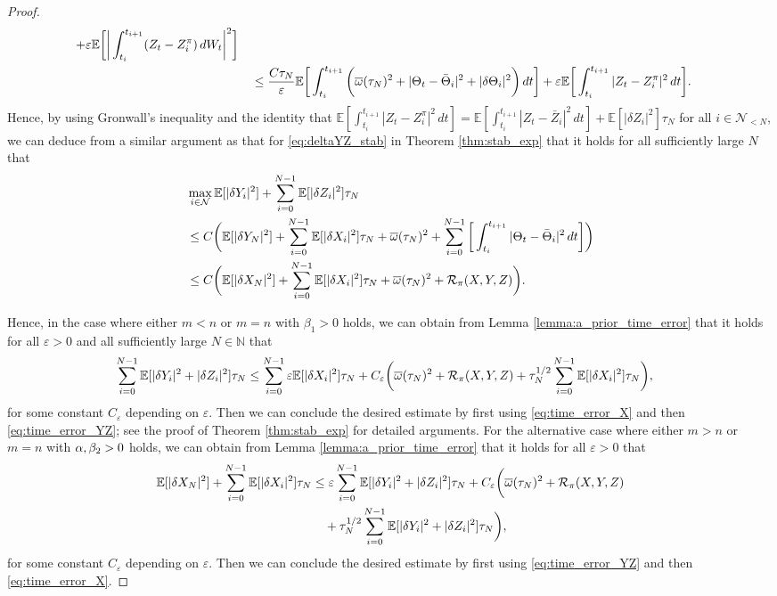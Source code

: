 \documentclass[11pt]{article}
\numberwithin{equation}{section}
\theoremstyle{definition}
\theoremstyle{remark}
\def\ol{\overline} \def\cl{\centerline}   \def\ul{\underline}
\def\l{\label}  \def\f{\frac}  \def\fa{\forall}
\def\eps{\varepsilon}
\def\cN{\mathcal{N}}
\def\cR{\mathcal{R}}
\def\sE{{\mathbb{E}}}
\def\sN{{\mathbb{N}}}
\begin{document}
\begin{proof}
\begin{align*}
\begin{split}
+
\eps\sE\bigg[ \bigg| \int_{t_i}^{t_{i+1}} ({Z}_t-Z^\pi_i)\,d W_t
 \bigg|^2 \bigg]
 \\
 &\quad 
 \le
\frac{C\tau_N}{\eps} \sE\bigg[     \int_{t_i}^{t_{i+1}}
\bigg(\ol{\om}(\tau_N)^2+|\Theta_t-\bar{\Theta}_i|^2+|\delta \Theta_i|^2
\bigg)
\,dt\bigg]
+
\eps\sE\bigg[  \int_{t_i}^{t_{i+1}} |{Z}_t-Z^\pi_i|^2\,dt
 \bigg].
 \end{split}
\end{align*}
Hence, by using Gronwall's inequality 
and 
the identity that
$\sE[\int_{t_i}^{t_{i+1}}| Z_t- {Z}^\pi_i|^2\,dt]
=
\sE[\int_{t_i}^{t_{i+1}}| Z_t- \bar{Z}_i|^2\,dt]
+\sE[|\delta Z_i|^2]\tau_N$ for all $i\in \cN_{<N}$,
we can deduce from  a similar argument as that for \eqref{eq:deltaYZ_stab}
 in Theorem \ref{thm:stab_exp}
 that
it holds for all sufficiently large $N$ that
\begin{align}
&\max_{i\in \cN}\sE[  |\delta Y_{i}|^2]+\sum_{i=0}^{N-1}\sE[|\delta Z_i|^2]\tau_N
\nb
\\
  &\le
 C\bigg(
 \sE[|\delta Y_N|^2]
 +\sum_{i=0}^{N-1}\sE[|\delta X_i|^2]\tau_N
 +
 \ol{\om}(\tau_N)^2
+\sum_{i=0}^{N-1}
\bigg[\int_{t_i}^{t_{i+1}} 
 |\Theta_t-\bar{\Theta}_i|^2
\,dt\bigg]
 \bigg)
 \nb
 \\
  &\le
 C\bigg(
 \sE[|\delta X_N|^2]
 +\sum_{i=0}^{N-1}\sE[|\delta X_i|^2]\tau_N
 +
 \ol{\om}(\tau_N)^2
+\cR_\pi(X,Y,Z)
 \bigg).
\l{eq:time_error_YZ}
  \end{align}

Hence, in the case where 
  either $m< n$ or $m=n$ with $\beta_1>0$ holds,
  we can obtain from Lemma \ref{lemma:a_prior_time_error} that
  it holds for all $\eps>0$
  and all sufficiently large $N\in \sN$ that
\begin{align*}
&
\sum_{i=0}^{N-1}
\sE[
|\delta Y_{i}|^2+|\delta {Z}_i|^2
 ]\tau_N
 \le
\sum_{i=0}^{N-1}
\eps\sE[
|\delta X_{i}|^2]\tau_N
+
C_\eps
\bigg(\ol{\om}(\tau_N)^2
+
\cR_\pi(X,Y,Z)
+\tau_N^{1/2}
\sum_{i=0}^{N-1}
\sE[
|\delta X_{i}|^2
]\tau_N
\bigg),
\end{align*}  
for some constant  $C_\eps$ depending on $\eps$.
Then we can conclude the desired estimate by first using \eqref{eq:time_error_X} and then \eqref{eq:time_error_YZ};
see the proof of   Theorem \ref{thm:stab_exp} for detailed arguments.
For the alternative case  where 
  either  $m>n$ or $m=n$ with $\alpha, \beta_2>0$ holds,
we can obtain from Lemma \ref{lemma:a_prior_time_error} that
  it holds for all $\eps>0$ that
\begin{align*}
 \sE[|\delta X_N|^2]+
\sum_{i=0}^{N-1}
\sE[
|\delta X_{i}|^2
 ]\tau_N
 &
 \le
\eps
\sum_{i=0}^{N-1}
\sE[
|\delta Y_{i}|^2+|\delta {Z}_i|^2]\tau_N
+
C_\eps\bigg(\ol{\om}(\tau_N)^2
+
\cR_\pi(X,Y,Z)
\\
&\quad
+\tau_N^{1/2}
\sum_{i=0}^{N-1}
\sE[
|\delta Y_{i}|^2+|\delta Z_{i}|^2
]\tau_N
\bigg),
\end{align*}
for some constant  $C_\eps$ depending on $\eps$.
Then we can conclude the desired estimate by first using  \eqref{eq:time_error_YZ} and then \eqref{eq:time_error_X}.
\end{proof}
\end{document}
